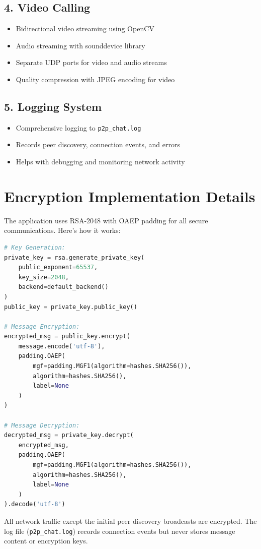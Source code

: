 \documentclass{article}
\begin{document}
\subsection*{4. Video Calling}
\begin{itemize}
    \item Bidirectional video streaming using OpenCV
    \item Audio streaming with sounddevice library
    \item Separate UDP ports for video and audio streams
    \item Quality compression with JPEG encoding for video
\end{itemize}

\subsection*{5. Logging System}
\begin{itemize}
    \item Comprehensive logging to \texttt{p2p\_chat.log}
    \item Records peer discovery, connection events, and errors
    \item Helps with debugging and monitoring network activity
\end{itemize}


\section*{Encryption Implementation Details}
The application uses RSA-2048 with OAEP padding for all secure communications. Here's how it works:

\begin{lstlisting}[language=Python]
# Key Generation:
private_key = rsa.generate_private_key(
    public_exponent=65537,
    key_size=2048,
    backend=default_backend()
)
public_key = private_key.public_key()

# Message Encryption:
encrypted_msg = public_key.encrypt(
    message.encode('utf-8'),
    padding.OAEP(
        mgf=padding.MGF1(algorithm=hashes.SHA256()),
        algorithm=hashes.SHA256(),
        label=None
    )
)

# Message Decryption:
decrypted_msg = private_key.decrypt(
    encrypted_msg,
    padding.OAEP(
        mgf=padding.MGF1(algorithm=hashes.SHA256()),
        algorithm=hashes.SHA256(),
        label=None
    )
).decode('utf-8')
\end{lstlisting}

All network traffic except the initial peer discovery broadcasts are encrypted. The log file (\texttt{p2p\_chat.log}) records connection events but never stores message content or encryption keys.
\end{document}
